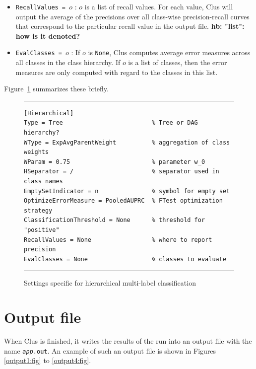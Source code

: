 \documentclass[a4paper]{report}
\begin{document}
\begin{itemize}
{\bf * hb: is the set of thresholds indeed written as a set, i.e. between curly braces?  And is it really $>t$, or $\geq t$?}
\item {\tt RecallValues = $o$} : $o$ is a list of recall values. For each value, Clus will output the average of the precisions over all class-wise precision-recall curves that correspond to the particular recall value in the output file.
{\bf * hb: "list": how is it denoted?}
\item {\tt EvalClasses = $o$} : If $o$ is {\tt None}, Clus computes average error measures across all classes in the class  hierarchy. If $o$ is a list of classes, then the error measures are only computed with regard to the classes in this list.
\end{itemize}

Figure~\ref{settings-hmc:fig} summarizes these briefly.

\begin{figure}
\hrule
\begin{verbatim}
[Hierarchical]
Type = Tree                         % Tree or DAG hierarchy?
WType = ExpAvgParentWeight          % aggregation of class weights
WParam = 0.75                       % parameter w_0
HSeparator = /                      % separator used in class names
EmptySetIndicator = n               % symbol for empty set
OptimizeErrorMeasure = PooledAUPRC  % FTest optimization strategy
ClassificationThreshold = None      % threshold for "positive"
RecallValues = None                 % where to report precision
EvalClasses = None                  % classes to evaluate
\end{verbatim}
\hrule
\caption{Settings specific for hierarchical multi-label classification}
\label{settings-hmc:fig}
\end{figure}

\chapter{Output file}

When Clus is finished, it writes the results of the run into an output file with the name
{\tt {\em app}.out}.  An example of such an output file is shown in Figures \ref{output1:fig} to \ref{output4:fig}.
\end{document}
